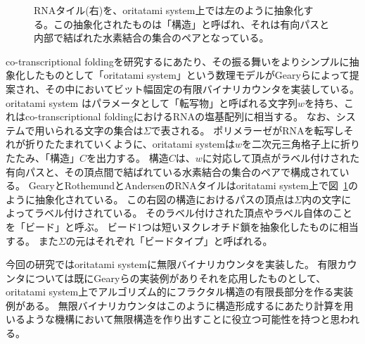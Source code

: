 \documentclass[a4,11pt]{article}
\begin{document}
\begin{figure}[tb]
    	\centering
	\caption{RNAタイル(右)を、oritatami system上では左のように抽象化する。この抽象化されたものは「構造」と呼ばれ、それは有向パスと内部で結ばれた水素結合の集合のペアとなっている。}
	\label{fig:tileabstract}
\end{figure}

co-transcriptional foldingを研究するにあたり、その振る舞いをよりシンプルに抽象化したものとして「oritatami system」という数理モデルがGearyらによって提案され\cite{GeMeScSe2019}、その中においてビット幅固定の有限バイナリカウンタを実装している。
oritatami system はパラメータとして「転写物」と呼ばれる文字列$w$を持ち、これはco-transcriptional foldingにおけるRNAの塩基配列に相当する。
なお、システムで用いられる文字の集合は$\Sigma$で表される。
ポリメラーゼがRNAを転写しそれが折りたたまれていくように、oritatami systemは$w$を二次元三角格子上に折りたたみ、「構造」$C$を出力する。
構造$C$は、$w$に対応して頂点がラベル付けされた有向パスと、その頂点間で結ばれている水素結合の集合のペアで構成されている。
GearyとRothemundとAndersenのRNAタイルはoritatami system上で図~\ref{fig:tileabstract}のように抽象化されている。
この右図の構造におけるパスの頂点は$\Sigma$内の文字によってラベル付けされている。
そのラベル付けされた頂点やラベル自体のことを「ビード」と呼ぶ。
ビード1つは短いヌクレオチド鎖を抽象化したものに相当する。
また$\Sigma$の元はそれぞれ「ビードタイプ」と呼ばれる。

今回の研究ではoritatami systemに無限バイナリカウンタを実装した。
有限カウンタについては既にGearyらの実装例があり\cite{GeMeScSe2019}それを応用したものとして、oritatami system上でアルゴリズム的にフラクタル構造の有限長部分を作る実装例がある\cite{heighway}。
無限バイナリカウンタはこのように構造形成するにあたり計算を用いるような機構において無限構造を作り出すことに役立つ可能性を持つと思われる。
\end{document}
